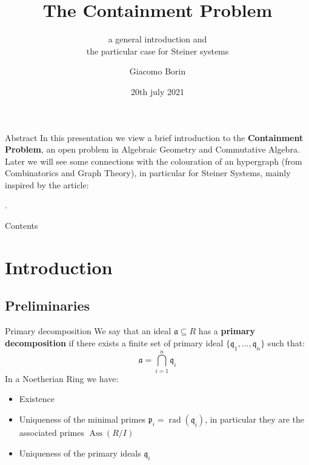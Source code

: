 \documentclass[dvipsnames]{beamer}
\title{The Containment Problem}
\subtitle{a general introduction and 
\\the particular case for Steiner systems}
\author{Giacomo Borin}
\institute{Università di Trento}
\date{20th july 2021}
\theoremstyle{plain}
\theoremstyle{remark}
\theoremstyle{definition}
\newtheorem{deff}[teo]{Definiton}
\newcommand{\p}{\mathfrak{p}}
\newcommand{\q}{\mathfrak{q}}
\newcommand{\A}{\mathfrak{a}}
\DeclareMathOperator{\rad}{rad}
\DeclareMathOperator{\Ann}{Ann}
\DeclareMathOperator{\Ass}{Ass}
\begin{document}
\begin{frame}
  \titlepage
\end{frame}

\begin{frame}[fragile]{Abstract}
In this presentation we view a brief introduction to the \textbf{Containment Problem}, an open problem in Algebraic Geometry and Commutative Algebra.\\
Later we will see some connections with the colouration of an hypergraph (from Combinatorics and Graph Theory), in particular for Steiner Systems, mainly inspired by the article: \\
\begin{exampleblock}{}
.
\end{exampleblock}
\end{frame}

\begin{frame}{Contents}
  \tableofcontents
\end{frame}

\section{Introduction}

\subsection{Preliminaries}

%
%


\begin{frame}{Primary decomposition}
We say that an ideal $ \A \subseteq R $ has a \textbf{primary decomposition}  if there exists a finite set of primary ideal $ \{ \q_1 , ... , \q_n\} $ such that:
\begin{equation*}
	\A = \bigcap_{i=1}^n \q_i
\end{equation*}\pause
In a Noetherian Ring we have:
\begin{itemize}
\item Existence
\item Uniqueness of the minimal primes $ \p_i = \rad(\q_i)$, in particular they are the associated primes $ \Ass(R/I) $
\item Uniqueness of the primary ideals $ \q_i $
\end{itemize}
\end{frame}
\end{document}
